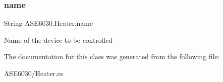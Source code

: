 \subsubsection{\texorpdfstring{name}{name}}
{\footnotesize\ttfamily String A\+S\+E6030.\+Heater.\+name\hspace{0.3cm}{\ttfamily [private]}}

Name of the device to be controlled 

The documentation for this class was generated from the following file\+:\begin{DoxyCompactItemize}
\item 
A\+S\+E6030/Heater.\+cs\end{DoxyCompactItemize}
